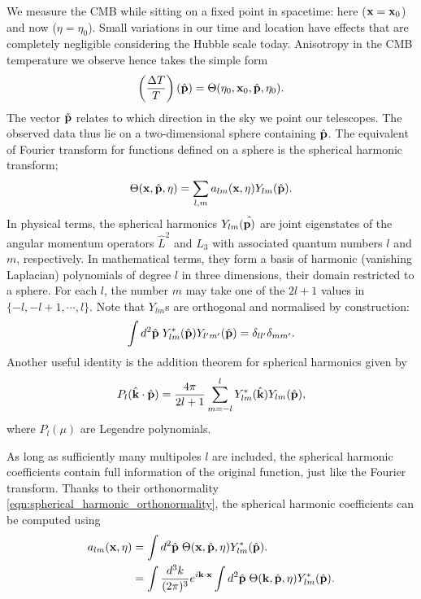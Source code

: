 We measure the CMB while sitting on a fixed point in spacetime: here ($\mathbf{x}=\mathbf{x}_0$) and now ($\eta=\eta_0$). Small variations in our time and location have effects that are completely negligible considering the Hubble scale today. Anisotropy in the CMB temperature we observe hence takes the simple form
\begin{align}
	\left( \frac{\Delta T}{T} \right) (\hat{\mathbf{p}}) = \Theta(\eta_0, \mathbf{x}_0, \hat{\mathbf{p}}, \eta_0).
\end{align}
The vector $\hat{\mathbf{p}}$ relates to which direction in the sky we point our telescopes. The observed data thus lie on a two-dimensional sphere containing $\hat{\mathbf{p}}$. The equivalent of Fourier transform for functions defined on a sphere is the spherical harmonic transform;
\begin{align}
	\Theta(\mathbf{x}, \hat{\mathbf{p}}, \eta) = \sum_{l,m} a_{lm}(\mathbf{x},\eta) Y_{lm}(\hat{\mathbf{p}}). 
\end{align} 
In physical terms, the spherical harmonics $Y_{lm}(\hat{\mathbf{p})}$ are joint eigenstates of the angular momentum operators $\hat{L}^2$ and $\hat{L}_3$ with associated quantum numbers $l$ and $m$, respectively. In mathematical terms, they form a basis of harmonic (vanishing Laplacian) polynomials of degree $l$ in three dimensions, their domain restricted to a sphere. For each $l$, the number $m$ may take one of the $2l+1$ values in $\{-l,-l+1,\cdots,l\}$. Note that $Y_{lm}$s are orthogonal and normalised by construction:
\begin{align}
	\int d^2\hat{\mathbf{p}} \; Y^*_{lm} (\hat{\mathbf{p}}) Y_{l'm'} (\hat{\mathbf{p}}) = \delta_{ll'} \delta_{mm'}. \label{eqn:spherical_harmonic_orthonormality}
\end{align}
Another useful identity is the addition theorem for spherical harmonics given by
\begin{align}
	P_l (\hat{\mathbf{k}} \cdot \hat{\mathbf{p}}) = \frac{4\pi}{2l+1} \sum_{m=-l}^{l} Y^*_{lm} (\hat{\mathbf{k}}) Y_{lm} (\hat{\mathbf{p}}), \label{eqn:harmonic_addition_theorem}
\end{align}
where $P_l(\mu)$ are Legendre polynomials.
	
As long as sufficiently many multipoles $l$ are included, the spherical harmonic coefficients contain full information of the original function, just like the Fourier transform. Thanks to their orthonormality \eqref{eqn:spherical_harmonic_orthonormality}, the spherical harmonic coefficients can be computed using
\begin{align}
	a_{lm} (\mathbf{x},\eta) &= \int d^2\hat{\mathbf{p}} \; \Theta(\mathbf{x}, \hat{\mathbf{p}},\eta) Y^*_{lm} (\hat{\mathbf{p}}). \\
	&= \int \frac{d^3 k}{(2\pi)^3} e^{i\mathbf{k}\cdot\mathbf{x}} \int d^2\hat{\mathbf{p}} \; \Theta(\mathbf{k},\hat{\mathbf{p}},\eta) Y^*_{lm}(\hat{\mathbf{p}}). \label{eqn:alm_derivation_alm_using_theta}
\end{align}

